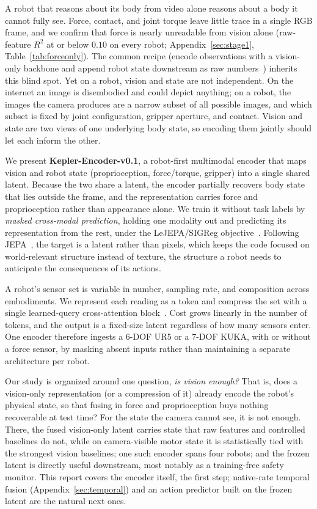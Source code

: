 \documentclass{article}
\begin{document}
A robot that reasons about its body from video alone reasons about a body it cannot fully see. Force, contact, and joint torque leave little trace in a single RGB frame, and we confirm that force is nearly unreadable from vision alone (raw-feature $R^2$ at or below $0.10$ on every robot; Appendix~\ref{sec:stage1}, Table~\ref{tab:forceonly}). The common recipe (encode observations with a vision-only backbone and append robot state downstream as raw numbers~\citep{openvla2024}) inherits this blind spot. Yet on a robot, vision and state are not independent. On the internet an image is disembodied and could depict anything; on a robot, the images the camera produces are a narrow subset of all possible images, and which subset is fixed by joint configuration, gripper aperture, and contact. Vision and state are two views of one underlying body state, so encoding them jointly should let each inform the other.

We present \textbf{Kepler-Encoder-v0.1}, a robot-first multimodal encoder that maps vision and robot state (proprioception, force/torque, gripper) into a single shared latent. Because the two share a latent, the encoder partially recovers body state that lies outside the frame, and the representation carries force and proprioception rather than appearance alone. We train it without task labels by \emph{masked cross-modal prediction}, holding one modality out and predicting its representation from the rest, under the LeJEPA/SIGReg objective~\citep{lejepa2025}. Following JEPA~\citep{ijepa2023}, the target is a latent rather than pixels, which keeps the code focused on world-relevant structure instead of texture, the structure a robot needs to anticipate the consequences of its actions.

A robot's sensor set is variable in number, sampling rate, and composition across embodiments. We represent each reading as a token and compress the set with a single learned-query cross-attention block~\citep{perceiver2021}. Cost grows linearly in the number of tokens, and the output is a fixed-size latent regardless of how many sensors enter. One encoder therefore ingests a 6-DOF UR5 or a 7-DOF KUKA, with or without a force sensor, by masking absent inputs rather than maintaining a separate architecture per robot.

Our study is organized around one question, \emph{is vision enough?} That is, does a vision-only representation (or a compression of it) already encode the robot's physical state, so that fusing in force and proprioception buys nothing recoverable at test time? For the state the camera cannot see, it is not enough. There, the fused vision-only latent carries state that raw features and controlled baselines do not, while on camera-visible motor state it is statistically tied with the strongest vision baselines; one such encoder spans four robots; and the frozen latent is directly useful downstream, most notably as a training-free safety monitor. This report covers the encoder itself, the first step; native-rate temporal fusion (Appendix~\ref{sec:temporal}) and an action predictor built on the frozen latent are the natural next ones.
\end{document}
